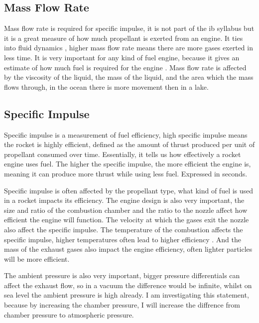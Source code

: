 \documentclass[12pt,a4paper]{article}
\begin{document}
\subsection{Mass Flow Rate}

Mass flow rate is required for specific impulse, it is not part of the ib syllabus but it is a great measure of how much propellant is exerted from an engine. It ties into fluid dynamics \cite{ref6}, higher mass flow rate means there are more gases exerted in less time. It is very important for any kind of fuel engine, because it gives an estimate of how much fuel is required for the engine \cite{ref7}. Mass flow rate is affected by the viscosity of the liquid, the mass of the liquid, and the area which the mass flows through, in the ocean there is more movement then in a lake.

\subsection{Specific Impulse}

Specific impulse is a measurement of fuel efficiency, high specific impulse means the rocket is highly efficient, defined as the amount of thrust produced per unit of propellant consumed over time. Essentially, it tells us how effectively a rocket engine uses fuel. The higher the specific impulse, the more efficient the engine is, meaning it can produce more thrust while using less fuel. Expressed in seconds.

Specific impulse is often affected by the propellant type, what kind of fuel is used in a rocket impacts its efficiency. The engine design is also very important, the size and ratio of the combustion chamber and the ratio to the nozzle affect how efficient the engine will function. The velocity at which the gases exit the nozzle also affect the specific impulse. The temperature of the combustion affects the specific impulse, higher temperatures often lead to higher efficiency \cite{ref9}. And the mass of the exhaust gases also impact the engine efficiency, often lighter particles will be more efficient.

The ambient pressure is also very important, bigger pressure differentials can affect the exhaust flow, so in a vacuum the difference would be infinite, whilst on sea level the ambient pressure is high already. I am investigating this statement, because by increasing the chamber pressure, I will increase the diffrence from chamber pressure to atmospheric pressure.
\end{document}
